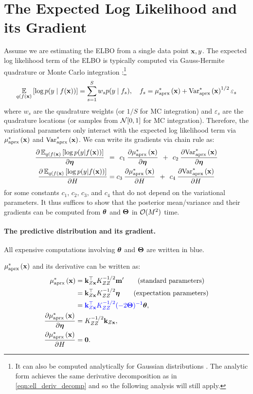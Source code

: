 \section{The Expected Log Likelihood and its Gradient}
Assume we are estimating the ELBO from a single data point $\mathbf{x}, y$.
The expected log likelihood term of the ELBO is typically computed via Gauss-Hermite quadrature or Monte Carlo integration \cite{hensman2015scalable}:\footnote{
  It can also be computed analytically for Gaussian distributions \cite{hensman2013gaussian}.
  The analytic form achieves the same derivative decomposition as in \cref{eqn:ell_deriv_decomp}
  and so the following analysis will still apply.
}
%
\[
  \operatorname*{\mathbb{E}}_{q(f(\mathbf{x})} \left[  \log p(y \mid f(\mathbf{x}))  \right] = \sum_{s=1}^S w_s p(y \mid f_s),
  \quad
  f_s = \mu^*_\text{aprx} \left( \mathbf{x} \right) + \text{Var}^*_\text{aprx} \left( \mathbf{x} \right)^{1/2} \varepsilon_s
\]
%
where $w_s$ are the quadrature weights (or $1/S$ for MC integration) and $\varepsilon_s$ are the quadrature locations (or samples from $\normaldist{0}{1}$ for MC integration).
Therefore, the variational parameters only interact with the expected log likelihood term via $\mu^*_\text{aprx} \left( \mathbf{x} \right)$ and $\text{Var}^*_\text{aprx} \left( \mathbf{x} \right)$.
We can write its gradients via chain rule as:
%
\begin{align}
  \frac{ \partial \operatorname*{\mathbb{E}}_{q(f(\mathbf{x})} \left[  \log p(y | f(\mathbf{x}))  \right]}{\partial \boldsymbol{\eta}}
  \:\: &= \:\:
  c_1 \: \frac{ \partial \mu^*_\text{aprx} \left( \mathbf{x} \right)}{\partial \boldsymbol{\eta}}
  \:\: + \:\:
  c_2 \:  \frac{ \partial \text{Var}^*_\text{aprx} \left( \mathbf{x} \right)}{\partial \boldsymbol{\eta}}
  \nonumber \\
  \frac{ \partial \operatorname*{\mathbb{E}}_{q(f(\mathbf{x})} \left[  \log p(y | f(\mathbf{x}))  \right]}{\partial H}
  &=
  c_3 \: \frac{ \partial \mu^*_\text{aprx} \left( \mathbf{x} \right)}{\partial H}
  \:\: + \:\:
  c_4 \:  \frac{ \partial \text{Var}^*_\text{aprx} \left( \mathbf{x} \right)}{\partial H}
  \label{eqn:ell_deriv_decomp}
\end{align}
%
for some constants $c_1$, $c_2$, $c_3$, and $c_4$ that do not depend on the variational parameters.
It thus suffices to show that the posterior mean/variance and their gradients can be computed from $\boldsymbol{\theta}$ and $\boldsymbol{\Theta}$ in $\bigo{M^2}$ time.

\paragraph{The predictive distribution and its gradient.}
All expensive computations involving $\boldsymbol{\theta}$ and $\boldsymbol{\Theta}$ are written in {\color{blue} blue}.

$\mu^*_\text{aprx} \left( \mathbf{x} \right)$ and its derivative can be written as:
%
\begin{align}
  \mu^*_\text{aprx} \left( \mathbf{x} \right)
  &= \mathbf{k}_{Z \mathbf{x}}^\top K_{ZZ}^{-1/2} \mathbf{m}'
  \tag{standard parameters} \\
  &= \mathbf{k}_{Z \mathbf{x}}^\top K_{ZZ}^{-1/2} \boldsymbol{\eta}
  \tag{expectation parameters} \\
  &= {\color{blue} \mathbf{k}_{Z \mathbf{x}}^\top K_{ZZ}^{-1/2} (-2 \boldsymbol{\Theta})^{-1}} \boldsymbol{\theta}
  \label{eqn:pred_mean_natural},
  \\
  \frac{\partial \mu^*_\text{aprx} \left( \mathbf{x} \right)}{\partial \boldsymbol{\eta}}
  &= K_{ZZ}^{-1/2} \mathbf{k}_{Z \mathbf{x}}
  \label{eqn:pred_mean_deriv},
  \\
  \frac{\partial \mu^*_\text{aprx} \left( \mathbf{x} \right)}{\partial H}
  &= \mathbf{0}.
  \nonumber
\end{align}


